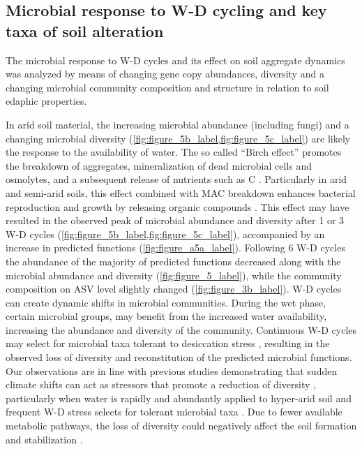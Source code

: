 \subsection{Microbial response to W-D cycling and key taxa of soil alteration}

The microbial response to W-D cycles and its effect on soil aggregate dynamics was analyzed by means of changing gene copy abundances, diversity and a changing microbial community composition and structure in relation to soil edaphic properties.

In arid soil material, the increasing microbial abundance (including fungi) and a changing microbial diversity (\cref{fig:figure_5b_label,fig:figure_5c_label}) are likely the response to the availability of water. 
The so called ``Birch effect'' promotes the breakdown of aggregates, mineralization of dead microbial cells and osmolytes, and a subsequent release of nutrients such as C \citep{Jarvis2007}. 
Particularly in arid and semi-arid soils, this effect combined with MAC breakdown enhances bacterial reproduction and growth by releasing organic compounds \citep{Armstrong2016, Seuss2022}. 
This effect may have resulted in the observed peak of microbial abundance and diversity after 1 or 3 W-D cycles (\cref{fig:figure_5b_label,fig:figure_5c_label}), accompanied by an increase in predicted functions (\cref{fig:figure_a5a_label}). 
Following 6 W-D cycles the abundance of the majority of predicted functions decreased along with the microbial abundance and diversity (\cref{fig:figure_5_label}), while the community composition on ASV level slightly changed (\cref{fig:figure_3b_label}). 
W-D cycles can create dynamic shifts in microbial communities. 
During the wet phase, certain microbial groups, may benefit from the increased water availability, increasing the abundance and diversity of the community. 
Continuous W-D cycles may select for microbial taxa tolerant to desiccation stress \citep{Evans2012}, resulting in the observed loss of diversity and reconstitution of the predicted microbial functions. 
Our observations are in line with previous studies demonstrating that sudden climate shifts can act as stressors that promote a reduction of diversity \citep{Clavel2011}, particularly when water is rapidly and abundantly applied to hyper-arid soil \citep{AzuaBustos2018} and frequent W-D stress selects for tolerant microbial taxa \citep{Seuss2022}. 
Due to fewer available metabolic pathways, the loss of diversity could negatively affect the soil formation and stabilization \citep{Bestion2020, Shen2023}.

